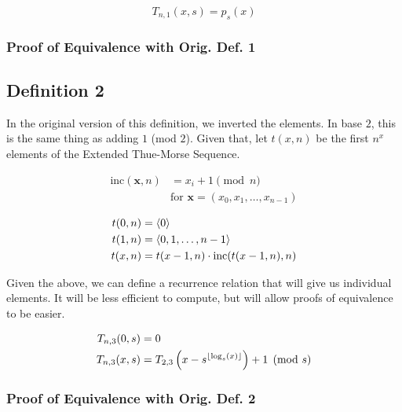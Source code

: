 \documentclass[conference]{IEEEtran}
\begin{document}
\begin{equation}
    T_{n,1}(x, s) = p_s(x)
\end{equation}

\subsubsection{Proof of Equivalence with Orig. Def. 1}

\subsection{Definition 2}

In the original version of this definition, we inverted the elements. In base $2$, this is the same thing as adding $1$ (mod $2$). Given that, let $t(x, n)$ be the first $n^x$ elements of the Extended Thue-Morse Sequence.

\begin{equation}
    \begin{aligned}
        \text{inc}(\mathbf{x}, n) &= x_i + 1 \pmod{n} \\
        &\text{for } \mathbf{x} = (x_0, x_1, \ldots, x_{n-1})
    \end{aligned}
\end{equation}

\begin{equation}
    \begin{aligned}
        t(0, n) &= \langle 0 \rangle \\
        t(1, n) &= \langle 0, 1, \ldots, n - 1 \rangle \\
        t(x, n) &= t(x - 1, n) \cdot \text{inc}(t(x - 1, n), n)
    \end{aligned}
\end{equation}

Given the above, we can define a recurrence relation that will give us individual elements. It will be less efficient to compute, but will allow proofs of equivalence to be easier.

\begin{equation}
    \begin{aligned}
        T_{n,3}(0, s) &= 0 \\
        T_{n,3}(x, s) &= T_{2,3}\left(x - s^{\left\lfloor \log_s(x) \right\rfloor}\right) + 1 \pmod{s}
    \end{aligned}
\end{equation}

\subsubsection{Proof of Equivalence with Orig. Def. 2}
\end{document}
